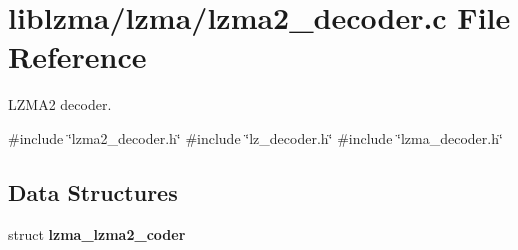 \section{liblzma/lzma/lzma2\+\_\+decoder.c File Reference}
\label{lzma2__decoder_8c}


L\+Z\+M\+A2 decoder.  


{\ttfamily \#include \char`\"{}lzma2\+\_\+decoder.\+h\char`\"{}}\newline
{\ttfamily \#include \char`\"{}lz\+\_\+decoder.\+h\char`\"{}}\newline
{\ttfamily \#include \char`\"{}lzma\+\_\+decoder.\+h\char`\"{}}\newline
\subsection*{Data Structures}
\begin{DoxyCompactItemize}
\item 
struct \textbf{ lzma\+\_\+lzma2\+\_\+coder}
\end{DoxyCompactItemize}
